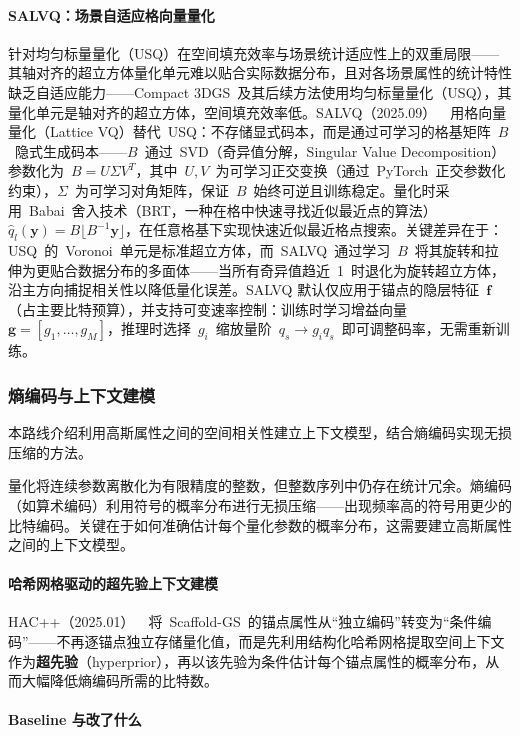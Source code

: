 \paragraph{SALVQ：场景自适应格向量量化} 针对均匀标量量化（USQ）在空间填充效率与场景统计适应性上的双重局限——其轴对齐的超立方体量化单元难以贴合实际数据分布，且对各场景属性的统计特性缺乏自适应能力——Compact 3DGS~及其后续方法使用均匀标量量化（USQ），其量化单元是轴对齐的超立方体，空间填充效率低。SALVQ（2025.09）~\cite{2509_13482}~用格向量量化（Lattice VQ）替代~USQ：不存储显式码本，而是通过可学习的格基矩阵~$B$~隐式生成码本——$B$~通过~SVD（奇异值分解，Singular Value Decomposition）参数化为~$B = U \Sigma V^T$，其中~$U, V$~为可学习正交变换（通过~PyTorch~正交参数化约束），$\Sigma$~为可学习对角矩阵，保证~$B$~始终可逆且训练稳定。量化时采用~Babai~舍入技术（BRT，一种在格中快速寻找近似最近点的算法）$\hat{q}_l(\mathbf{y}) = B \lfloor B^{-1} \mathbf{y} \rfloor$，在任意格基下实现快速近似最近格点搜索。关键差异在于：USQ~的~Voronoi~单元是标准超立方体，而~SALVQ~通过学习~$B$~将其旋转和拉伸为更贴合数据分布的多面体——当所有奇异值趋近~1~时退化为旋转超立方体，沿主方向捕捉相关性以降低量化误差。SALVQ 默认仅应用于锚点的隐层特征~$\mathbf{f}$（占主要比特预算），并支持可变速率控制：训练时学习增益向量~$\mathbf{g} = [g_1, \dots, g_M]$，推理时选择~$g_i$~缩放量阶~$q_s \to g_i q_s$~即可调整码率，无需重新训练。

\subsubsection{熵编码与上下文建模}

本路线介绍利用高斯属性之间的空间相关性建立上下文模型，结合熵编码实现无损压缩的方法。

量化将连续参数离散化为有限精度的整数，但整数序列中仍存在统计冗余。熵编码（如算术编码）利用符号的概率分布进行无损压缩——出现频率高的符号用更少的比特编码。关键在于如何准确估计每个量化参数的概率分布，这需要建立高斯属性之间的上下文模型。

\paragraph{哈希网格驱动的超先验上下文建模}

HAC++（2025.01）~\cite{2501_12255}~将~Scaffold-GS~的锚点属性从``独立编码''转变为``条件编码''——不再逐锚点独立存储量化值，而是先利用结构化哈希网格提取空间上下文作为\textbf{超先验}（hyperprior），再以该先验为条件估计每个锚点属性的概率分布，从而大幅降低熵编码所需的比特数。

\paragraph{Baseline 与改了什么}


